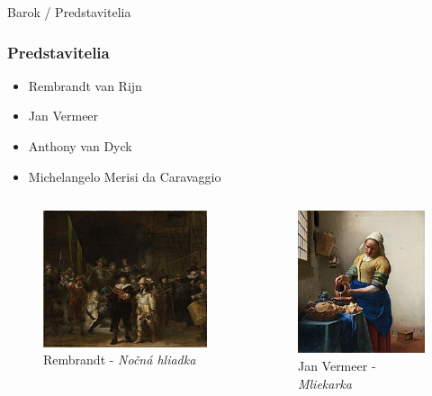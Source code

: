 \documentclass[dvipsnames]{beamer}
\begin{document}
\begin{frame}{\small \textcolor{g}{Barok} / \Large Predstavitelia}
	\subsubsection{Predstavitelia}
	\begin{itemize}
		\item Rembrandt van Rijn
		\item Jan Vermeer
		\item Anthony van Dyck
		\item Michelangelo Merisi da Caravaggio
	\end{itemize}
	\begin{columns}
		\kern0pt
		\begin{figure}
			\includegraphics[scale=0.5]{hlidka}
			\vskip 1mm
			\caption{\centering \textcolor{BurntOrange}{Rembrandt} - \textit{Nočná hliadka}}
		\end{figure}%

		\begin{figure}
			\includegraphics[scale=0.45]{milk}
			\caption{\centering \textcolor{BurntOrange}{Jan Vermeer} - \textit{Mliekarka}}
		\end{figure}%


\end{columns}
\end{frame}
\end{document}
